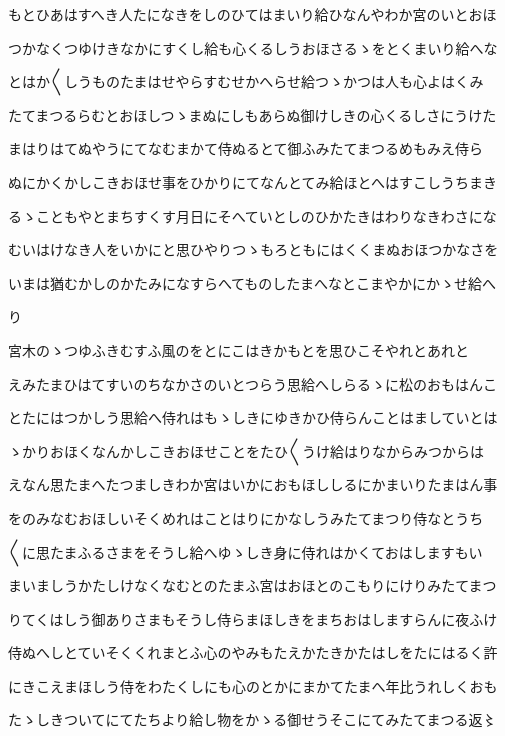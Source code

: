 \documentclass[a4paper,11pt,landscape]{ltjtarticle}
\begin{document}
\par\medskip
もとひあはすへき人たになきをしのひてはまいり給ひなんやわか宮のいとおほ
\par\medskip
つかなくつゆけきなかにすくし給も心くるしうおほさるゝをとくまいり給へな
\par\medskip
とはか〱しうものたまはせやらすむせかへらせ給つゝかつは人も心よはくみ
\par\medskip
たてまつるらむとおほしつゝまぬにしもあらぬ御けしきの心くるしさにうけた
\par\medskip
まはりはてぬやうにてなむまかて侍ぬるとて御ふみたてまつるめもみえ侍ら
\par\medskip
ぬにかくかしこきおほせ事をひかりにてなんとてみ給ほとへはすこしうちまき
\par\medskip
るゝこともやとまちすくす月日にそへていとしのひかたきはわりなきわさにな
\par\medskip
むいはけなき人をいかにと思ひやりつゝもろともにはくくまぬおほつかなさを
\par\medskip
いまは猶むかしのかたみになすらへてものしたまへなとこまやかにかゝせ給へ
\par\medskip
り
\par\medskip
宮木のゝつゆふきむすふ風のをとにこはきかもとを思ひこそやれとあれと
\par\medskip
えみたまひはてすいのちなかさのいとつらう思給へしらるゝに松のおもはんこ
\par\medskip
とたにはつかしう思給へ侍れはもゝしきにゆきかひ侍らんことはましていとは
\par\medskip
ゝかりおほくなんかしこきおほせことをたひ〱うけ給はりなからみつからは
\par\medskip
えなん思たまへたつましきわか宮はいかにおもほししるにかまいりたまはん事
\par\medskip
をのみなむおほしいそくめれはことはりにかなしうみたてまつり侍なとうち
\par\medskip
〱に思たまふるさまをそうし給へゆゝしき身に侍れはかくておはしますもい
\par\medskip
まいましうかたしけなくなむとのたまふ宮はおほとのこもりにけりみたてまつ
\par\medskip
りてくはしう御ありさまもそうし侍らまほしきをまちおはしますらんに夜ふけ
\par\medskip
侍ぬへしとていそくくれまとふ心のやみもたえかたきかたはしをたにはるく許
\par\medskip
にきこえまほしう侍をわたくしにも心のとかにまかてたまへ年比うれしくおも
\par\medskip
たゝしきついてにてたちより給し物をかゝる御せうそこにてみたてまつる返〻
\end{document}
